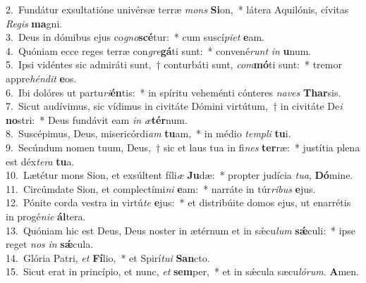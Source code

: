 {2.~}Fundátur exsultatióne univérsæ terræ \textit{mons} \textbf{Si}on,~* látera Aquilónis, cívitas \textit{Re}\textit{gis} \textbf{ma}gni.\\
{3.~}Deus in dómibus ejus co\textit{gno}\textbf{scé}tur:~* cum suscí\textit{pi}\textit{et} \textbf{e}am.\\
{4.~}Quóniam ecce reges terræ con\textit{gre}\textbf{gá}ti sunt:~* convené\textit{runt} \textit{in} \textbf{u}num.\\
{5.~}Ipsi vidéntes sic admiráti sunt,~† conturbáti sunt, \textit{com}\textbf{mó}ti sunt:~* tremor appre\textit{hén}\textit{dit} \textbf{e}os.\\
{6.~}Ibi dolóres ut partu\textit{ri}\textbf{én}tis:~* in spíritu veheménti cónteres \textit{na}\textit{ves} \textbf{Thar}sis.\\
{7.~}Sicut audívimus, sic vídimus in civitáte Dómini virtútum,~† in civitáte De\textit{i} \textbf{no}stri:~* Deus fundávit eam \textit{in} \textit{æ}\textbf{tér}num.\\
{8.~}Suscépimus, Deus, misericórdi\textit{am} \textbf{tu}am,~* in médio \textit{tem}\textit{pli} \textbf{tu}i.\\
{9.~}Secúndum nomen tuum, Deus,~† sic et laus tua in fi\textit{nes} \textbf{ter}ræ:~* justítia plena est déx\textit{te}\textit{ra} \textbf{tu}a.\\
{10.~}Lætétur mons Sion, et exsúltent fíli\textit{æ} \textbf{Ju}dæ:~* propter judícia \textit{tu}\textit{a}, \textbf{Dó}mine.\\
{11.~}Circúmdate Sion, et complectími\textit{ni} \textbf{e}am:~* narráte in túr\textit{ri}\textit{bus} \textbf{e}jus.\\
{12.~}Pónite corda vestra in virtú\textit{te} \textbf{e}jus:~* et distribúite domos ejus, ut enarrétis in progé\textit{ni}\textit{e} \textbf{ál}tera.\\
{13.~}Quóniam hic est Deus, Deus noster in ætérnum et in sǽcu\textit{lum} \textbf{sǽ}culi:~* ipse reget \textit{nos} \textit{in} \textbf{sǽ}cula.\\
{14.~}Glória Patri, \textit{et} \textbf{Fí}lio,~* et Spirí\textit{tu}\textit{i} \textbf{San}cto.\\
{15.~}Sicut erat in princípio, et nunc, \textit{et} \textbf{sem}per,~* et in sǽcula sæcu\textit{ló}\textit{rum}. \textbf{A}men.\\
